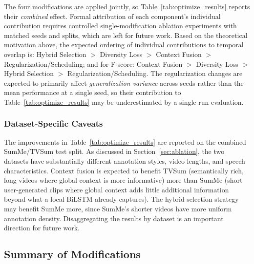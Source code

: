 \documentclass[10pt,conference]{IEEEtran}
\begin{document}
The four modifications are applied jointly, so
Table~\ref{tab:optimize_results} reports their \emph{combined} effect. Formal
attribution of each component's individual contribution requires controlled
single-modification ablation experiments with matched seeds and splits, which
are left for future work. Based on the theoretical motivation above, the
expected ordering of individual contributions to temporal overlap is:
Hybrid Selection $>$ Diversity Loss $>$ Context Fusion $>$ Regularization/Scheduling;
and for F-score: Context Fusion $>$ Diversity Loss $>$ Hybrid Selection $>$
Regularization/Scheduling. The regularization changes are expected to primarily
affect \emph{generalization variance} across seeds rather than the mean
performance at a single seed, so their contribution to
Table~\ref{tab:optimize_results} may be underestimated by a single-run
evaluation.

\subsubsection{Dataset-Specific Caveats}

The improvements in Table~\ref{tab:optimize_results} are reported on the
combined SumMe/TVSum test split. As discussed in Section~\ref{sec:ablation},
the two datasets have substantially different annotation styles, video lengths,
and speech characteristics. Context fusion is expected to benefit TVSum
(semantically rich, long videos where global context is more informative) more
than SumMe (short user-generated clips where global context adds little
additional information beyond what a local BiLSTM already captures). The
hybrid selection strategy may benefit SumMe more, since SumMe's shorter videos
have more uniform annotation density. Disaggregating the results by dataset
is an important direction for future work.

\subsection{Summary of Modifications}
\end{document}
